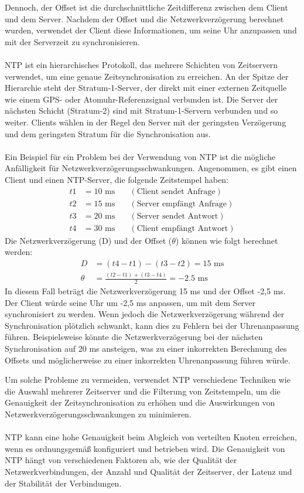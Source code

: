 \documentclass[../vs-script-first-v01.tex]{subfiles}
\begin{document}
Dennoch, der Offset ist die durchschnittliche Zeitdifferenz zwischen dem Client und dem Server. Nachdem der Offset und die Netzwerkverzögerung berechnet wurden, verwendet der Client diese Informationen, um seine Uhr anzupassen und mit der Serverzeit zu synchronisieren.
\\\\
NTP ist ein hierarchisches Protokoll, das mehrere Schichten von Zeitservern verwendet, um eine genaue Zeitsynchronisation zu erreichen. An der Spitze der Hierarchie steht der Stratum-1-Server, der direkt mit einer externen Zeitquelle wie einem GPS- oder Atomuhr-Referenzsignal verbunden ist. Die Server der nächsten Schicht (Stratum-2) sind mit Stratum-1-Servern verbunden und so weiter. Clients wählen in der Regel den Server mit der geringsten Verzögerung und dem geringsten Stratum für die Synchronisation aus.
\\\\
Ein Beispiel für ein Problem bei der Verwendung von NTP ist die mögliche Anfälligkeit für Netzwerkverzögerungsschwankungen. Angenommen, es gibt einen Client und einen NTP-Server, die folgende Zeitstempel haben:
\begin{align*}
t1 &= 10 \text{ ms} \quad &(\text{Client sendet Anfrage}) \\
t2 &= 15 \text{ ms} \quad &(\text{Server empfängt Anfrage}) \\
t3 &= 20 \text{ ms} \quad &(\text{Server sendet Antwort}) \\
t4 &= 30 \text{ ms} \quad &(\text{Client empfängt Antwort})
\end{align*}
Die Netzwerkverzögerung (D) und der Offset (\(\theta\)) können wie folgt berechnet werden:
\begin{align*}
D &= (t4 - t1) - (t3 - t2) = 15 \text{ ms} \\
\theta &= \frac{(t2 - t1) + (t3 - t4)}{2} = -2.5 \text{ ms}
\end{align*}
In diesem Fall beträgt die Netzwerkverzögerung 15 ms und der Offset -2,5 ms. Der Client würde seine Uhr um -2,5 ms anpassen, um mit dem Server synchronisiert zu werden. Wenn jedoch die Netzwerkverzögerung während der Synchronisation plötzlich schwankt, kann dies zu Fehlern bei der Uhrenanpassung führen. Beispielsweise könnte die Netzwerkverzögerung bei der nächsten Synchronisation auf 20 ms ansteigen, was zu einer inkorrekten Berechnung des Offsets und möglicherweise zu einer inkorrekten Uhrenanpassung führen würde.

Um solche Probleme zu vermeiden, verwendet NTP verschiedene Techniken wie die Auswahl mehrerer Zeitserver und die Filterung von Zeitstempeln, um die Genauigkeit der Zeitsynchronisation zu erhöhen und die Auswirkungen von Netzwerkverzögerungsschwankungen zu minimieren.
\\\\
NTP kann eine hohe Genauigkeit beim Abgleich von verteilten Knoten erreichen, wenn es ordnungsgemäß konfiguriert und betrieben wird. Die Genauigkeit von NTP hängt von verschiedenen Faktoren ab, wie der Qualität der Netzwerkverbindungen, der Anzahl und Qualität der Zeitserver, der Latenz und der Stabilität der Verbindungen.
\end{document}
